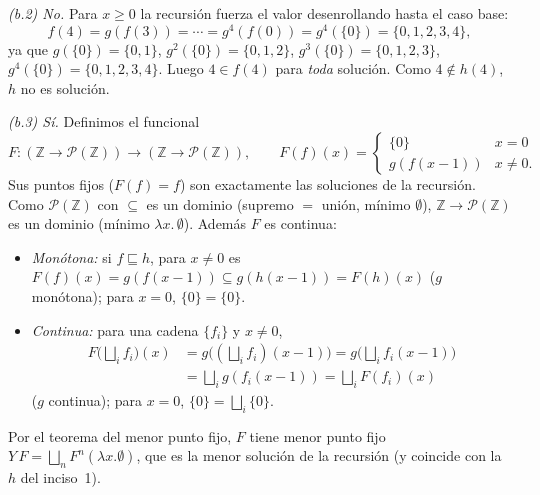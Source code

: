 \smallskip
\noindent\emph{(b.2) No.} Para $x \ge 0$ la recursión fuerza el valor desenrollando hasta el caso base:
\[
f(4) = g(f(3)) = \cdots = g^4(f(0)) = g^4(\{0\}) = \{0,1,2,3,4\},
\]
ya que $g(\{0\})=\{0,1\}$, $g^2(\{0\})=\{0,1,2\}$, $g^3(\{0\})=\{0,1,2,3\}$, $g^4(\{0\})=\{0,1,2,3,4\}$.
Luego $4 \in f(4)$ para \emph{toda} solución. Como $4 \notin h(4)$, $h$ no es solución.

\smallskip
\noindent\emph{(b.3) Sí.} Definimos el funcional
\[
F : (\mathbb{Z} \to \mathcal{P}(\mathbb{Z})) \to (\mathbb{Z} \to \mathcal{P}(\mathbb{Z})),
\qquad
F(f)(x) = \begin{cases} \{0\} & x = 0 \\ g(f(x-1)) & x \neq 0. \end{cases}
\]
Sus puntos fijos ($F(f) = f$) son exactamente las soluciones de la recursión.
Como $\mathcal{P}(\mathbb{Z})$ con $\subseteq$ es un dominio (supremo $=$ unión, mínimo $\emptyset$),
$\mathbb{Z} \to \mathcal{P}(\mathbb{Z})$ es un dominio (mínimo $\lambda x.\,\emptyset$).
Además $F$ es continua:
\begin{itemize}
  \item \emph{Monótona:} si $f \sqsubseteq h$, para $x \neq 0$ es $F(f)(x) = g(f(x-1)) \subseteq g(h(x-1)) = F(h)(x)$ ($g$ monótona); para $x=0$, $\{0\}=\{0\}$.
  \item \emph{Continua:} para una cadena $\{f_i\}$ y $x \neq 0$,
    \[
    \begin{aligned}
    F\Big(\textstyle\bigsqcup_i f_i\Big)(x)
    &= g\big((\textstyle\bigsqcup_i f_i)(x-1)\big)
     = g\big(\textstyle\bigsqcup_i f_i(x-1)\big) \\
    &= \textstyle\bigsqcup_i g(f_i(x-1))
     = \textstyle\bigsqcup_i F(f_i)(x)
    \end{aligned}
    \]
    ($g$ continua); para $x=0$, $\{0\} = \bigsqcup_i \{0\}$.
\end{itemize}
Por el teorema del menor punto fijo, $F$ tiene menor punto fijo
$Y\,F = \bigsqcup_n F^n(\lambda x.\emptyset)$, que es la menor solución de la recursión
(y coincide con la $h$ del inciso~1).
